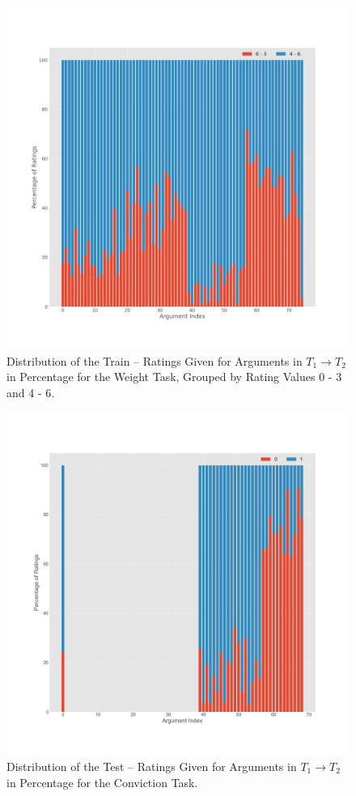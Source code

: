 \begin{figure}[!ht]
    \centering
    \includegraphics[width=1\textwidth]{images/T1_T2_train_Weight.jpg}
    \caption{Distribution of the Train – Ratings Given for Arguments in $T_1 \to T_2$ in Percentage for the Weight Task, Grouped by Rating Values 0 - 3 and 4 - 6.}
    \label{fig:conviction_t1_t2_train}
\end{figure}

\begin{figure}[!ht]
    \centering
    \includegraphics[width=1\textwidth]{images/T1_T2_test_Conviction.jpg}
    \caption{Distribution of the Test – Ratings Given for Arguments in $T_1 \to T_2$ in Percentage for the Conviction Task.}
    \label{fig:conviction_t1_t2_test}
\end{figure}

